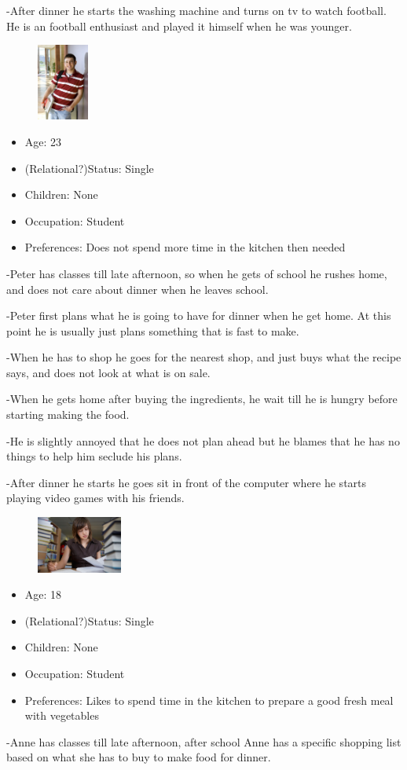 -After dinner he starts the washing machine and turns on tv to watch football. He is an football enthusiast and played it himself when he was younger. 
\begin{figure}[H]
	\includegraphics[width=0.15\textwidth]{Grafik/FoodPlanner/PersonaPeterNielsen}
	\label{PersonaHenrikJensen}
\end{figure}
\begin{itemize}
	\item Age: 23
	\item (Relational?)Status: Single
	\item Children: None
	\item Occupation: Student
	\item Preferences: Does not spend more time in the kitchen then needed
\end{itemize}
-Peter has classes till late afternoon, so when he gets of school he rushes home, and does not care about dinner when he leaves school.

-Peter first plans what he is going to have for dinner when he get home. At this point he is usually just plans something that is fast to make.

-When he has to shop he goes for the nearest shop, and just buys what the recipe says, and does not look at what is on sale.

-When he gets home after buying the ingredients, he wait till he is hungry before starting making the food.

-He is slightly annoyed that he does not plan ahead but he blames that he has no things to help him seclude his plans.

-After dinner he starts he goes sit in front of the computer where he starts playing video games with his friends.


\begin{figure}[H]
	\includegraphics[width=0.25\textwidth]{Grafik/FoodPlanner/PersonaAnneMadsen}
	\label{PersonaHenrikJensen}
\end{figure}
\begin{itemize}
	\item Age: 18
	\item (Relational?)Status: Single
	\item Children: None
	\item Occupation: Student
	\item Preferences: Likes to spend time in the kitchen to prepare a good fresh meal with vegetables
\end{itemize}
-Anne has classes till late afternoon, after school Anne has a specific shopping list based on what she has to buy to make food for dinner.

